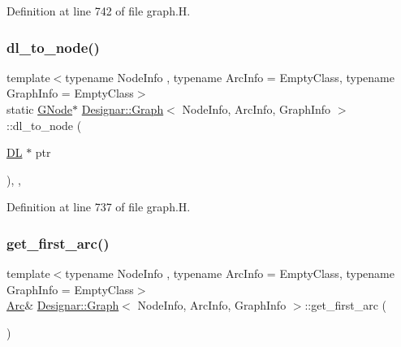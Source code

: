 Definition at line 742 of file graph.\+H.

\mbox{\label{class_designar_1_1_graph_ab6f1de18d2ec0c537fc1daa5b4a42e01}} 
\subsubsection{\texorpdfstring{dl\+\_\+to\+\_\+node()}{dl\_to\_node()}}
{\footnotesize\ttfamily template$<$typename Node\+Info , typename Arc\+Info  = Empty\+Class, typename Graph\+Info  = Empty\+Class$>$ \\
static \hyperlink{class_designar_1_1_graph_a7e61951db0bb9bfa8a2e317440d4e17f}{G\+Node}$\ast$ \hyperlink{class_designar_1_1_graph}{Designar\+::\+Graph}$<$ Node\+Info, Arc\+Info, Graph\+Info $>$\+::dl\+\_\+to\+\_\+node (\begin{DoxyParamCaption}\item[{\hyperlink{class_designar_1_1_d_l}{DL} $\ast$}]{ptr }\end{DoxyParamCaption})\hspace{0.3cm}{\ttfamily [inline]}, {\ttfamily [static]}, {\ttfamily [protected]}}



Definition at line 737 of file graph.\+H.

\mbox{\label{class_designar_1_1_graph_a6829f963f0db1fffbc535557f39ed877}} 
\subsubsection{\texorpdfstring{get\+\_\+first\+\_\+arc()}{get\_first\_arc()}\hspace{0.1cm}{\footnotesize\ttfamily [1/2]}}
{\footnotesize\ttfamily template$<$typename Node\+Info , typename Arc\+Info  = Empty\+Class, typename Graph\+Info  = Empty\+Class$>$ \\
\hyperlink{class_designar_1_1_graph_a74c730ef4ce2d20f998d72bd25c2b5bf}{Arc}\& \hyperlink{class_designar_1_1_graph}{Designar\+::\+Graph}$<$ Node\+Info, Arc\+Info, Graph\+Info $>$\+::get\+\_\+first\+\_\+arc (\begin{DoxyParamCaption}{ }\end{DoxyParamCaption})\hspace{0.3cm}{\ttfamily [inline]}}



